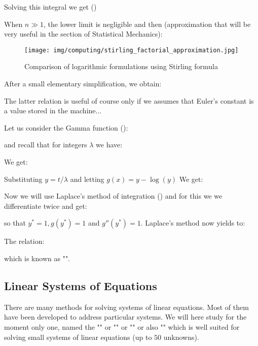 	
	Solving this integral we get ()
	
	
	When $n \gg 1$, the lower limit is negligible and then (approximation that will be very useful in the section of Statistical Mechanics):
	
	\begin{figure}[H]
		\centering
		\texttt{[image: img/computing/stirling\_factorial\_approximation.jpg]}
		\caption{Comparison of logarithmic formulations using Stirling formula}
	\end{figure}
	
	After a small elementary simplification, we obtain:
	
	
	The latter relation is useful of course only if we assumes that Euler's constant is a value stored in the machine...
	
	Let us consider the Gamma function ():
	
	and recall that for integers $\lambda$ we have:
	
	We get:
	
	Substituting $y=t/\lambda$ and letting $g(x)=y-\log (y)$ We get: 
	
	Now we will use Laplace's method of integration () and for this we we differentiate twice and get:
	
	so that $y^*=1,g(y^*)=1$ and $g''(y^*)=1$. Laplace's method now
	yields to:
	
	The relation:
	
	which is known as "".
	
	\pagebreak
	\subsection{Linear Systems of Equations}\label{linear systems of equations}
	
	There are many methods for solving systems of linear equations. Most of them have been developed to address particular systems. We will here study for the moment only one, named the "" or "" or "" or also  "" which is well suited for solving small systems of linear equations (up to $50$ unknowns).
	
